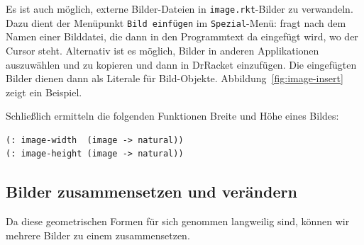 Es ist auch möglich, externe Bilder-Dateien in
\texttt{image.rkt}-Bilder zu verwandeln.  Dazu dient der Menüpunkt
\texttt{Bild einfügen} im \texttt{Spezial}-Menü: \drscheme{} fragt
nach dem Namen einer Bilddatei, die dann in den Programmtext da
eingefügt wird, wo der Cursor steht.  Alternativ ist es möglich,
Bilder in anderen Applikationen auszuwählen und zu kopieren und dann
in DrRacket einzufügen.  Die eingefügten Bilder dienen dann als
Literale für Bild-Objekte.  Abbildung~\ref{fig:image-insert} zeigt ein
Beispiel.

Schließlich ermitteln die folgenden Funktionen Breite und Höhe
eines Bildes:
%
\begin{lstlisting}
(: image-width  (image -> natural))
(: image-height (image -> natural))
\end{lstlisting}
%

\subsection{Bilder zusammensetzen und verändern}

Da diese geometrischen Formen für sich genommen langweilig sind,
können wir mehrere Bilder zu einem zusammensetzen.

